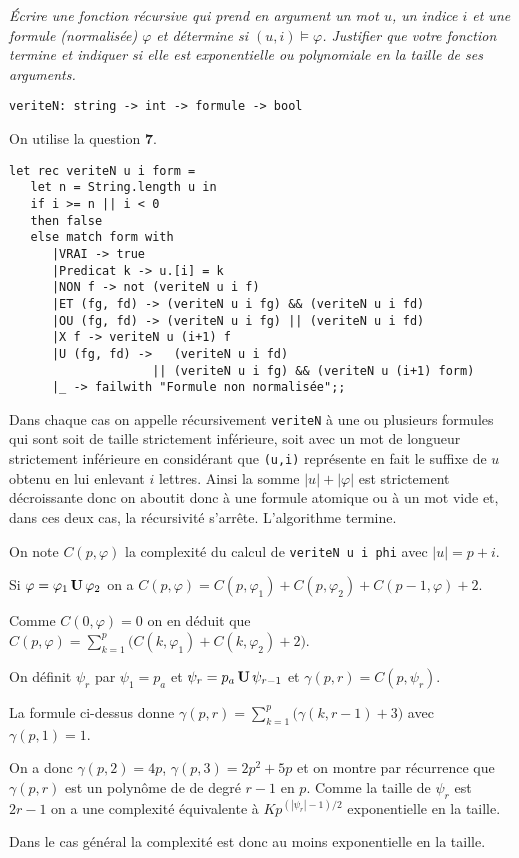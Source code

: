 \begin{Exercise}\it
Écrire une fonction récursive  qui prend en argument un mot $u$, un indice $i$ et une formule (normalisée) $\varphi$ et détermine si $(u, i)\vDash \varphi$. Justifier que votre fonction termine et indiquer si elle est exponentielle ou polynomiale en la taille de ses arguments.
\begin{lstlisting}
veriteN: string -> int -> formule -> bool
\end{lstlisting}
\end{Exercise}
\begin{Answer} On utilise la question {\bf 7}.
\begin{lstlisting}
let rec veriteN u i form = 
   let n = String.length u in
   if i >= n || i < 0
   then false
   else match form with 
      |VRAI -> true
      |Predicat k -> u.[i] = k
      |NON f -> not (veriteN u i f)
      |ET (fg, fd) -> (veriteN u i fg) && (veriteN u i fd)
      |OU (fg, fd) -> (veriteN u i fg) || (veriteN u i fd)
      |X f -> veriteN u (i+1) f
      |U (fg, fd) ->   (veriteN u i fd) 
                    || (veriteN u i fg) && (veriteN u (i+1) form)
      |_ -> failwith "Formule non normalisée";;
\end{lstlisting} 



Dans chaque cas on appelle récursivement {\tt veriteN} à une ou plusieurs formules qui sont soit de taille strictement inférieure, soit  avec un mot de longueur strictement inférieure en considérant que {\tt (u,i)} représente en fait le suffixe de $u$ obtenu en lui enlevant $i$ lettres. Ainsi la somme $|u|+|\varphi|$ est strictement décroissante donc on aboutit donc à une formule atomique ou à un mot vide et, dans ces deux cas, la récursivité s'arrête. L'algorithme termine.

On note $C(p,\varphi)$ la complexité du calcul de {\tt veriteN u i phi} avec $|u| = p + i$.

Si $\varphi = \varphi_1\, {\bf U}\, \varphi_2$ on a $C(p,\varphi)= C(p,\varphi_1)+C(p,\varphi_2)+C(p-1,\varphi)+2$.

Comme $C(0,\varphi)=0$ on en déduit que $\displaystyle C(p,\varphi)=\sum_{k=1}^{p} \bigl(C(k,\varphi_1)+C(k,\varphi_2)+2\bigr)$.

On définit $\psi_r$ par $\psi_1=p_a$ et $\psi_r=p_a\,{\bf U}\, \psi_{r-1}$ et $\gamma(p,r) = C(p,\psi_r)$.

La formule ci-dessus donne $\displaystyle \gamma(p,r) = \sum_{k=1}^{p} \bigl(\gamma(k,r-1)+3\bigr)$ avec $\gamma(p,1)=1$.

On a donc $\gamma(p,2)=4p$, $\gamma(p,3)=2p^2+5p$ et on montre par récurrence que $\gamma(p,r)$ est un polynôme de de degré $r-1$ en $p$.
Comme la taille de $\psi_r$ est $2r-1$ on a une complexité équivalente à $Kp^{(|\psi_r|-1)/2}$ exponentielle en la taille.

Dans le cas général la complexité est donc au moins exponentielle en la taille.
\end{Answer}
